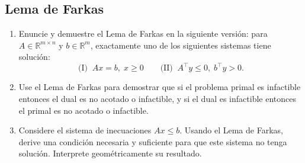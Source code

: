 \documentclass[12pt]{article}
\theoremstyle{plain}
\begin{document}
\bigskip

\subsection{Lema de Farkas}

\begin{enumerate}[label=\alph*)]
      \item Enuncie y demuestre el Lema de Farkas en la siguiente versión: para
            $A \in \mathbb{R}^{m \times n}$ y $b \in \mathbb{R}^m$, exactamente uno de los
            siguientes sistemas tiene solución:
            \[
                  \text{(I)}\;\; Ax = b,\; x \geq 0 \qquad \text{(II)}\;\; A^\top y \leq 0,\;
                  b^\top y > 0.
            \]

      \item Use el Lema de Farkas para demostrar que si el problema primal es infactible
            entonces el dual es no acotado o infactible, y si el dual es infactible entonces
            el primal es no acotado o infactible.

      \item Considere el sistema de inecuaciones $Ax \leq b$. Usando el Lema de Farkas,
            derive una condición necesaria y suficiente para que este sistema no tenga
            solución. Interprete geométricamente su resultado.
\end{enumerate}
\end{document}
